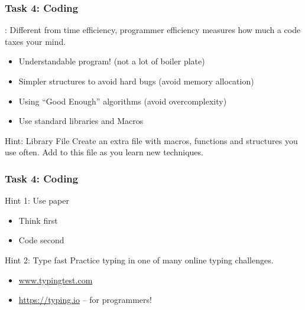 \documentclass{beamer}
\begin{document}
\begin{frame}
  \frametitle{Task 4: Coding} 

  : Different from time efficiency,
  programmer efficiency measures how much a code taxes your mind.

  \begin{itemize}
  \item Understandable program! (not a lot of boiler plate)
  \item Simpler structures to avoid hard bugs (avoid memory allocation)
  \item Using ``Good Enough'' algorithms (avoid overcomplexity)
  \item Use standard libraries and Macros
  \end{itemize}


  \begin{exampleblock}{Hint: Library File}
    Create an extra file with macros, functions and structures you use
    often. Add to this file as you learn new techniques. 
  \end{exampleblock}
\end{frame}

\begin{frame}
  \frametitle{Task 4: Coding}
  \begin{block}{Hint 1: Use paper}
    \begin{itemize}
    \item Think first
    \item Code second
    \end{itemize}
  \end{block}

  \begin{exampleblock}{Hint 2: Type fast}
    Practice typing in one of many online typing challenges.
    \begin{itemize}
    \item \url{www.typingtest.com}
    \item \url{https://typing.io} -- for programmers!
    \end{itemize}    
  \end{exampleblock}
\end{frame}
\end{document}
